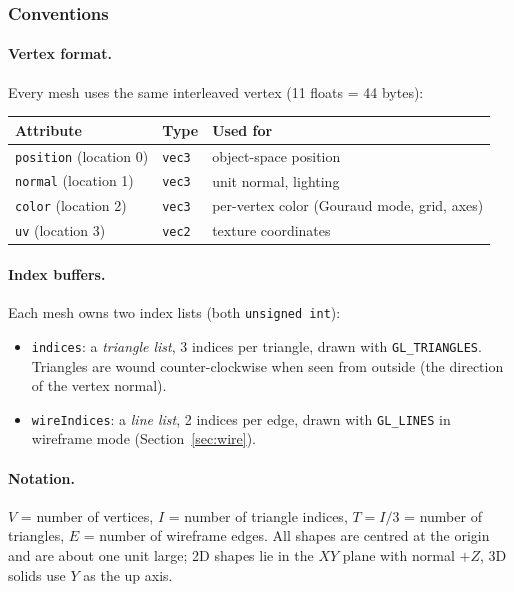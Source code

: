 \documentclass[a4paper, 11pt]{article}
\newcommand{\code}[1]{\texttt{#1}}
\begin{document}
\subsubsection{Conventions}

\paragraph{Vertex format.} Every mesh uses the same interleaved vertex (11 floats = 44 bytes):
\begin{center}
\small
\begin{tabular}{@{}lll@{}}
\toprule
\textbf{Attribute} & \textbf{Type} & \textbf{Used for}\\
\midrule
\code{position} (location 0) & \code{vec3} & object-space position\\
\code{normal}   (location 1) & \code{vec3} & unit normal, lighting\\
\code{color}    (location 2) & \code{vec3} & per-vertex color (Gouraud mode, grid, axes)\\
\code{uv}       (location 3) & \code{vec2} & texture coordinates\\
\bottomrule
\end{tabular}
\end{center}

\paragraph{Index buffers.} Each mesh owns two index lists (both \code{unsigned int}):
\begin{itemize}
  \item \code{indices}: a \emph{triangle list}, 3 indices per triangle, drawn with \code{GL\_TRIANGLES}. Triangles are
        wound counter-clockwise when seen from outside (the direction of the vertex normal).
  \item \code{wireIndices}: a \emph{line list}, 2 indices per edge, drawn with \code{GL\_LINES} in wireframe mode
        (Section~\ref{sec:wire}).
\end{itemize}

\paragraph{Notation.} $V$ = number of vertices, $I$ = number of triangle indices, $T=I/3$ = number of triangles,
$E$ = number of wireframe edges. All shapes are centred at the origin and are about one unit large; 2D shapes lie in the
$XY$ plane with normal $+Z$, 3D solids use $Y$ as the up axis.
\end{document}
